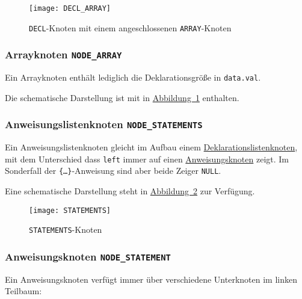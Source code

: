 \begin{figure}[h!]
\centering
\texttt{[image: DECL\_ARRAY]}
\caption{\texttt{DECL}-Knoten mit einem angeschlossenen \texttt{ARRAY}-Knoten}
\label{fig:declnode}
\end{figure}

\subsubsection{Arrayknoten \texttt{NODE\_ARRAY}}
\label{sec:arraynode}
Ein Arrayknoten enthält lediglich die Deklarationsgröße in \texttt{data.val}.

Die schematische Darstellung ist mit in \hyperref[fig:declnode]{Abbildung~\ref{fig:declnode}} enthalten.

\subsubsection{Anweisungslistenknoten \texttt{NODE\_STATEMENTS}}
\label{sec:stmtsnode}
Ein Anweisungslistenknoten gleicht im Aufbau einem \hyperref[sec:declsnode]{Deklarationslistenknoten},
mit dem Unterschied dass \texttt{left} immer auf einen \hyperref[sec:stmtnode]{Anweisungsknoten} zeigt.
Im Sonderfall der \texttt{\{\ldots\}}-Anweisung sind aber beide Zeiger \texttt{NULL}.

Eine schematische Darstellung steht in \hyperref[fig:stmtsnode]{Abbildung~\ref{fig:stmtsnode}} zur Verfügung.

\begin{figure}[h!]
\centering
\texttt{[image: STATEMENTS]}
\caption{\texttt{STATEMENTS}-Knoten}
\label{fig:stmtsnode}
\end{figure}

\subsubsection{Anweisungsknoten \texttt{NODE\_STATEMENT}}
\label{sec:stmt}
Ein Anweisungsknoten verfügt immer über verschiedene Unterknoten im linken Teilbaum:


